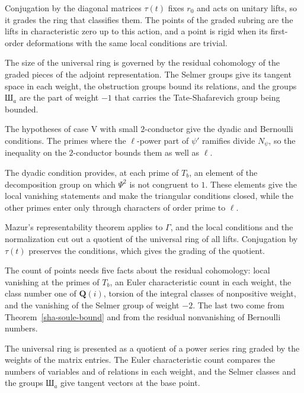 Conjugation by the diagonal matrices $\tau(t)$ fixes $r_0$ and acts on unitary lifts, so it grades the ring that classifies them. The points of the graded subring are the lifts in characteristic zero up to this action, and a point is rigid when its first-order deformations with the same local conditions are trivial.

The size of the universal ring is governed by the residual cohomology of the graded pieces of the adjoint representation. The Selmer groups give its tangent space in each weight, the obstruction groups bound its relations, and the groups $\text{Ш}_a$ are the part of weight $-1$ that carries the Tate-Shafarevich group being bounded.

The hypotheses of case V with small $2$-conductor give the dyadic and Bernoulli conditions. The primes where the $\ell$-power part of $\psi'$ ramifies divide $N_\psi$, so the inequality on the $2$-conductor bounds them as well as $\ell$.

The dyadic condition provides, at each prime of $T_b$, an element of the decomposition group on which $\Psi^2$ is not congruent to $1$. These elements give the local vanishing statements and make the triangular conditions closed, while the other primes enter only through characters of order prime to $\ell$.

Mazur's representability theorem applies to $\Gamma$, and the local conditions and the normalization cut out a quotient of the universal ring of all lifts. Conjugation by $\tau(t)$ preserves the conditions, which gives the grading of the quotient.

The count of points needs five facts about the residual cohomology: local vanishing at the primes of $T_b$, an Euler characteristic count in each weight, the class number one of $\mathbf Q(i)$, torsion of the integral classes of nonpositive weight, and the vanishing of the Selmer group of weight $-2$. The last two come from Theorem~\ref{sha-soule-bound} and from the residual nonvanishing of Bernoulli numbers.

The universal ring is presented as a quotient of a power series ring graded by the weights of the matrix entries. The Euler characteristic count compares the numbers of variables and of relations in each weight, and the Selmer classes and the groups $\text{Ш}_a$ give tangent vectors at the base point.

